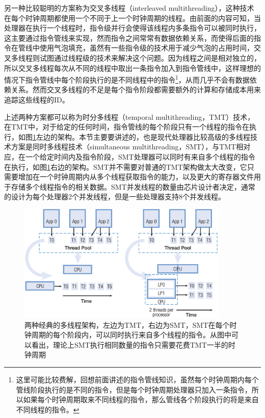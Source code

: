 另一种比较聪明的方案称为交叉多线程（interleaved multithreading），这种技术在每个时钟周期都使用一个不同于上一个时钟周期的线程。由前面的内容可知，当处理器在执行一个线程时，指令级并行会使得该线程内多条指令可以被同时执行，这主要通过指令管线来实现，然而指令之间常常有数据依赖关系，而使得后面的指令在管线中使用气泡填充，虽然有一些指令级的技术用于减少气泡的占用时间，交叉多线程则试图通过线程级的技术来解决这个问题。因为线程之间是相对独立的，所以交叉多线程每次从不同的线程中取出一条指令加入到指令管线中，这样理想的情况下指令管线中每个阶段执行的是不同线程中的指令\footnote{这里可能比较费解，回想前面讲述的指令管线知识，虽然每个时钟周期内每个管线阶段执行的是不同的指令，但是每个时钟周期处理器只加入一条指令，所以如果每个时钟周期取来不同线程的指令，那么管线各个阶段执行的将是来自不同线程的指令。}，从而几乎不会有数据依赖关系。然而交叉多线程的不足是每个指令阶段都需要额外的计算和存储成本用来追踪这些线程的ID。

上述两种方案都可以称为时分多线程（temporal multithreading，TMT）技术，在TMT中，对于给定的任何时间，指令管线的每个阶段只有一个线程的指令在执行，如图\ref{f:rp-smt}左边的架构。本节主要要讲述的，也是现代处理器比较高级的多线程技术方案是同时多线程技术（simultaneous multithreading，SMT），与TMT相对应，在一个给定时间内及指令阶段，SMT处理器可以同时有来自多个线程的指令在执行，如图\ref{f:rp-smt}右边的架构。SMT并不需要对普通的TMT架构做太大改变，它只需要增加在一个时钟周期内从多个线程获取指令的能力，以及更大的寄存器文件用于存储多个线程指令的相关数据。SMT并发线程的数量由芯片设计者决定，通常的设计为每个处理器2个并发线程，但是一些处理器支持8个并发线程。

\begin{figure}
	\includegraphics[width=0.9\textwidth]{figures/rp/smt}
	\caption{两种经典的多线程架构，左边为TMT，右边为SMT，SMT在每个时钟周期的每个阶段内，可以同时执行来自多个线程的指令。从图中可以看出，理论上SMT执行相同数量的指令只需要花费TMT一半的时钟周期}
	\label{f:rp-smt}
\end{figure}

